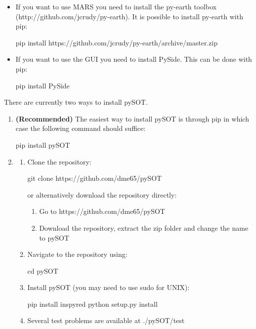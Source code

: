 \documentclass[]{article}
\begin{document}
\begin{itemize}
\item If you want to use MARS you need to install the py-earth toolbox 
\newline (http://github.com/jcrudy/py-earth). It is possible to install py-earth with pip:
\begin{python}
pip install https://github.com/jcrudy/py-earth/archive/master.zip
\end{python}
\item If you want to use the GUI you need to install PySide. This can be done with pip:
\begin{python}
pip install PySide
\end{python}
\end{itemize}

\noindent There are currently two ways to install pySOT.
\begin{enumerate}
\item \textbf{(Recommended)} The easiest way to install pySOT is through pip in which case 
the following command should suffice:
\begin{python}
pip install pySOT
\end{python}
\item 
\begin{enumerate}
\item Clone the repository: 
\begin{python}
git clone https://github.com/dme65/pySOT
\end{python} 
or alternatively download the repository directly:
\begin{enumerate}
\item Go to https://github.com/dme65/pySOT
\item Download the repository, extract the zip folder and change the name to pySOT
\end{enumerate}
\item Navigate to the repository using:
\begin{python}
cd pySOT
\end{python} 
\item Install pySOT (you may need to use sudo for UNIX):
\begin{python}
pip install inspyred
python setup.py install
\end{python} 
\item Several test problems are available at ./pySOT/test
\end{enumerate}
\end{enumerate}
\end{document}

